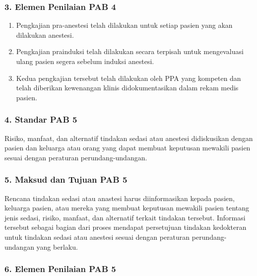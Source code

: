 \documentclass[
]{book}
\providecommand{\tightlist}{%
  \setlength{\itemsep}{0pt}\setlength{\parskip}{0pt}}
\begin{document}
\hypertarget{elemen-penilaian-pab-4}{%
\subsubsection*{3. Elemen Penilaian PAB 4}\label{elemen-penilaian-pab-4}}

\begin{enumerate}
\def\labelenumi{\alph{enumi}.}
\tightlist
\item
  Pengkajian pra-anestesi telah dilakukan untuk setiap pasien yang akan dilakukan anestesi.
\item
  Pengkajian prainduksi telah dilakukan secara terpisah untuk mengevaluasi ulang pasien segera sebelum induksi anestesi.
\item
  Kedua pengkajian tersebut telah dilakukan oleh PPA yang kompeten dan telah diberikan kewenangan klinis didokumentasikan dalam rekam medis pasien.
\end{enumerate}

\hypertarget{standar-pab-5}{%
\subsubsection*{4. Standar PAB 5}\label{standar-pab-5}}

Risiko, manfaat, dan alternatif tindakan sedasi atau anestesi didiskusikan dengan pasien dan keluarga atau orang yang dapat membuat keputusan mewakili pasien sesuai dengan peraturan perundang-undangan.

\hypertarget{maksud-dan-tujuan-pab-5}{%
\subsubsection*{5. Maksud dan Tujuan PAB 5}\label{maksud-dan-tujuan-pab-5}}

Rencana tindakan sedasi atau anastesi harus diinformasikan kepada pasien, keluarga pasien, atau mereka yang membuat keputusan mewakili pasien tentang jenis sedasi, risiko, manfaat, dan alternatif terkait tindakan tersebut. Informasi tersebut sebagai bagian dari proses mendapat persetujuan tindakan kedokteran untuk tindakan sedasi atau anestesi sesuai dengan peraturan perundang-undangan yang berlaku.

\hypertarget{elemen-penilaian-pab-5}{%
\subsubsection*{6. Elemen Penilaian PAB 5}\label{elemen-penilaian-pab-5}}
\end{document}
